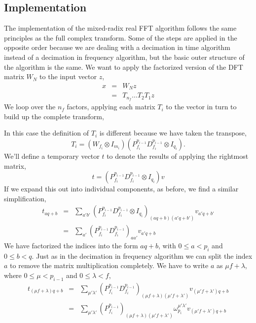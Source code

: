 \documentclass[fleqn,12pt]{article}
\newenvironment{algorithm}{\begin{quote} %
\begin{algorithmic}\samepage}{\end{algorithmic} %
\end{quote}}
\begin{document}
\subsection{Implementation}
%
The implementation of the mixed-radix real FFT algorithm follows the
same principles as the full complex transform. Some of the steps are
applied in the opposite order because we are dealing with a decimation
in time algorithm instead of a decimation in frequency algorithm, but
the basic outer structure of the algorithm is the same. We want to
apply the factorized version of the DFT matrix $W_N$ to the input
vector $z$,
%
\begin{eqnarray}
x &=& W_N z \\
  &=& T_{n_f} \dots T_2 T_1 z
\end{eqnarray}
%
We loop over the $n_f$ factors, applying each matrix $T_i$ to the
vector in turn to build up the complete transform,
%
\begin{algorithm}
\ENDFOR
\end{algorithm}
%
In this case the definition of $T_i$ is different because we have
taken the transpose,
%
\begin{equation}
T_i = 
  (W_{f_i} \otimes I_{m_i}) 
  (P^{p_{i-1}}_{f_i} D^{p_{i-1}}_{f_i} \otimes I_{q_i}).
\end{equation}
%
We'll define a temporary vector $t$ to denote the results of applying the
rightmost matrix,
%
\begin{equation}
t = (P^{p_{i-1}}_{f_i} D^{p_{i-1}}_{f_i} \otimes I_{q_i}) v
\end{equation}
%
If we expand this out into individual components, as before, we find a
similar simplification,
%
\begin{eqnarray}
t_{aq+b} 
&=&
\sum_{a'b'} 
(P^{p_{i-1}}_{f_i} D^{p_{i-1}}_{f_i} \otimes I_{q_i})_{(aq+b)(a'q+b')}
v_{a'q+b'} \\
&=&
\sum_{a'} 
(P^{p_{i-1}}_{f_i} D^{p_{i-1}}_{f_i})_{a a'}
v_{a'q+b} 
\end{eqnarray}
%
We have factorized the indices into the form $aq+b$, with $0 \leq a <
p_{i}$ and $0 \leq b < q$.  Just as in the decimation in frequency
algorithm we can split the index $a$ to remove the matrix
multiplication completely. We have to write $a$ as $\mu f + \lambda$,
where $0 \leq \mu < p_{i-1}$ and $0 \leq \lambda < f$,
%
\begin{eqnarray}
t_{(\mu f + \lambda)q+b} 
&=&
\sum_{\mu'\lambda'} 
(P^{p_{i-1}}_{f_i} D^{p_{i-1}}_{f_i})_{(\mu f + \lambda)(\mu' f + \lambda')}
v_{(\mu' f + \lambda')q+b} 
\\
&=&
\sum_{\mu'\lambda'} 
(P^{p_{i-1}}_{f_i})_{(\mu f + \lambda)(\mu' f + \lambda')}
\omega^{\mu'\lambda'}_{p_{i}}
v_{(\mu' f + \lambda')q+b}
\end{eqnarray}
\end{document}
